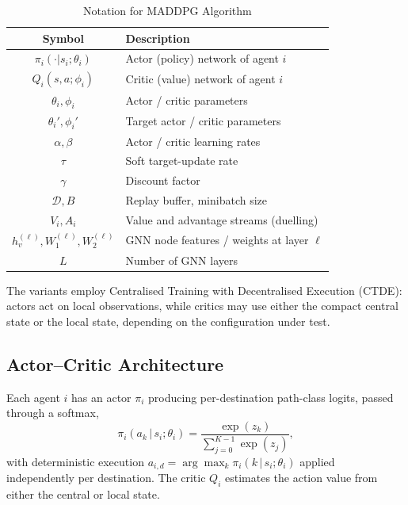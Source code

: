 \documentclass[10pt,journal,comsoc]{IEEEtran}
\begin{document}
\begin{table}[!t]
  \centering
  \caption{Notation for MADDPG Algorithm}
  \label{tab:maddpg_notation}
  \begin{tabular}{cl}
    \toprule
    \textbf{Symbol} & \textbf{Description} \\
    \midrule
    $\pi_i(\cdot|s_i;\theta_i)$ & Actor (policy) network of agent $i$ \\
    $Q_i(s,a;\phi_i)$ & Critic (value) network of agent $i$ \\
    $\theta_i,\phi_i$ & Actor / critic parameters \\
    $\theta_i',\phi_i'$ & Target actor / critic parameters \\
    $\alpha,\beta$ & Actor / critic learning rates \\
    $\tau$ & Soft target-update rate \\
    $\gamma$ & Discount factor \\
    $\mathcal{D},B$ & Replay buffer, minibatch size \\
    $V_i,A_i$ & Value and advantage streams (duelling) \\
    $h_v^{(\ell)}, W_1^{(\ell)},W_2^{(\ell)}$ & GNN node features / weights at layer $\ell$ \\
    $L$ & Number of GNN layers \\
    \bottomrule
  \end{tabular}
\end{table}

The variants employ Centralised Training with Decentralised Execution (CTDE): actors act on local observations, while critics may use either the compact central state or the local state, depending on the configuration under test.

\subsection{Actor--Critic Architecture}
Each agent $i$ has an actor $\pi_i$ producing per-destination path-class logits, passed through a softmax,
\begin{equation}
  \pi_i(a_k\,|\,s_i;\theta_i) = \frac{\exp(z_k)}{\sum_{j=0}^{K-1}\exp(z_j)},
  \label{eq:softmax_policy}
\end{equation}
with deterministic execution $a_{i,d} = \arg\max_{k}\pi_i(k\,|\,s_i;\theta_i)$ applied independently per destination. The critic $Q_i$ estimates the action value from either the central or local state.
\end{document}
